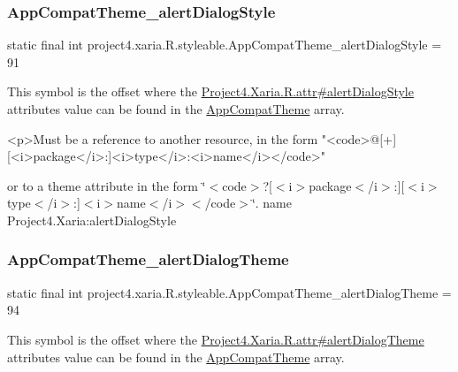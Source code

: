 \subsubsection{\texorpdfstring{App\+Compat\+Theme\+\_\+alert\+Dialog\+Style}{AppCompatTheme\_alertDialogStyle}}
{\footnotesize\ttfamily static final int project4.\+xaria.\+R.\+styleable.\+App\+Compat\+Theme\+\_\+alert\+Dialog\+Style = 91\hspace{0.3cm}{\ttfamily [static]}}

This symbol is the offset where the \hyperlink{}{Project4.\+Xaria.\+R.\+attr\#alert\+Dialog\+Style} attribute\textquotesingle{}s value can be found in the \hyperlink{classproject4_1_1xaria_1_1R_1_1styleable_aad8bec413e2350f9404e6ff0e831a85d}{App\+Compat\+Theme} array.

\begin{DoxyVerb}      <p>Must be a reference to another resource, in the form "<code>@[+][<i>package</i>:]<i>type</i>:<i>name</i></code>"
\end{DoxyVerb}
 or to a theme attribute in the form \char`\"{}$<$code$>$?\mbox{[}$<$i$>$package$<$/i$>$\+:\mbox{]}\mbox{[}$<$i$>$type$<$/i$>$\+:\mbox{]}$<$i$>$name$<$/i$>$$<$/code$>$\char`\"{}.  name Project4.\+Xaria\+:alert\+Dialog\+Style \mbox{\label{classproject4_1_1xaria_1_1R_1_1styleable_a5721980038eb99ff7b34164c0824b0f6}} 
\subsubsection{\texorpdfstring{App\+Compat\+Theme\+\_\+alert\+Dialog\+Theme}{AppCompatTheme\_alertDialogTheme}}
{\footnotesize\ttfamily static final int project4.\+xaria.\+R.\+styleable.\+App\+Compat\+Theme\+\_\+alert\+Dialog\+Theme = 94\hspace{0.3cm}{\ttfamily [static]}}

This symbol is the offset where the \hyperlink{}{Project4.\+Xaria.\+R.\+attr\#alert\+Dialog\+Theme} attribute\textquotesingle{}s value can be found in the \hyperlink{classproject4_1_1xaria_1_1R_1_1styleable_aad8bec413e2350f9404e6ff0e831a85d}{App\+Compat\+Theme} array.

